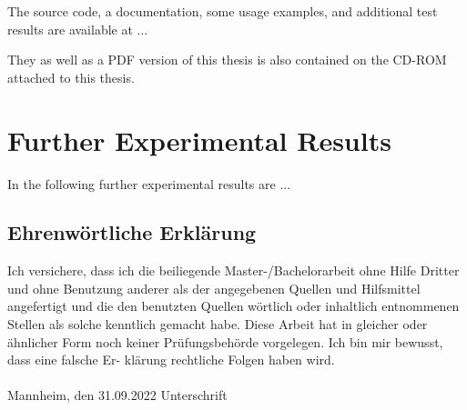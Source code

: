 \documentclass[11pt,titlepage,oneside,openany]{book}
\begin{document}
The source code, a documentation, some usage examples, and additional test results are available at ...

They as well as a PDF version of this thesis is also contained on the CD-ROM attached to this thesis.

\chapter{Further Experimental Results}
\label{cha:appendix-b}

In the following further experimental results are ...


\newpage


\pagestyle{empty}


\section*{Ehrenw\"ortliche Erkl\"arung}
Ich versichere, dass ich die beiliegende Master-/Bachelorarbeit ohne Hilfe Dritter
und ohne Benutzung anderer als der angegebenen Quellen und Hilfsmittel
angefertigt und die den benutzten Quellen w\"ortlich oder inhaltlich
entnommenen Stellen als solche kenntlich gemacht habe. Diese Arbeit
hat in gleicher oder \"ahnlicher Form noch keiner Pr\"ufungsbeh\"orde
vorgelegen. Ich bin mir bewusst, dass eine falsche Er- kl\"arung rechtliche Folgen haben
wird.
\\
\\

\noindent
Mannheim, den 31.09.2022 \hspace{4cm} Unterschrift
\end{document}
